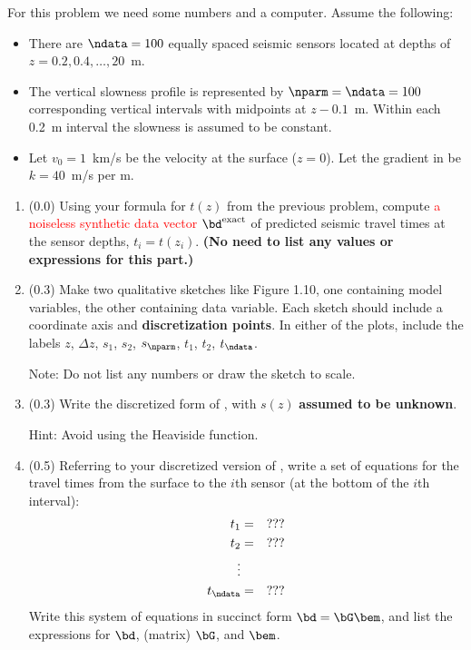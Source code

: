 \documentclass[11pt,titlepage,fleqn]{article}
\begin{document}
For this problem we need some numbers and a computer. Assume the following:
%
\begin{itemize}
\item There are $\ndata=100$ equally spaced seismic sensors located at depths of $z = 0.2, 0.4, \ldots, 20$~m.
\item The vertical slowness profile is represented by $\nparm=\ndata=100$ corresponding vertical intervals with midpoints at $z - 0.1$~m. Within each 0.2~m interval the slowness is assumed to be constant.
\item Let $v_0 = 1$~km/s be the velocity at the surface ($z=0$). Let the gradient in  be $k = 40$~m/s per m.
\end{itemize}

\begin{enumerate}

\item (0.0) Using your formula for $t(z)$ from the previous problem, compute \textcolor{red}{a noiseless synthetic data vector $\bd^{\rm exact}$} of predicted seismic travel times at the sensor depths, $t_i = t(z_i)$. 
{\bf (No need to list any values or expressions for this part.)}

\item (0.3)  Make two qualitative sketches like Figure 1.10, one containing model variables, the other containing data variable. Each sketch should include a coordinate axis and {\bf discretization points}. In either of the plots, include the labels $z$, $\Delta z$, $s_1$, $s_2$, $s_\nparm$, $t_1$, $t_2$, $t_\ndata$.

Note: Do not list any numbers or draw the sketch to scale.


\item (0.3) Write the discretized form of , with $s(z)$ {\bf assumed to be unknown}.

Hint: Avoid using the Heaviside function.


\item (0.5) Referring to your discretized version of , write a set of equations for the travel times from the surface to the $i$th sensor (at the bottom of the $i$th interval):
%
\begin{eqnarray*}
t_1 &=& ???
\\
t_2 &=& ???
\\
\vdots
\\
t_\ndata &=& ???
\end{eqnarray*}
% 
Write this system of equations in succinct form $\bd = \bG\bem$, and list the expressions for $\bd$, (matrix) $\bG$, and $\bem$.


\end{enumerate}
\end{document}
